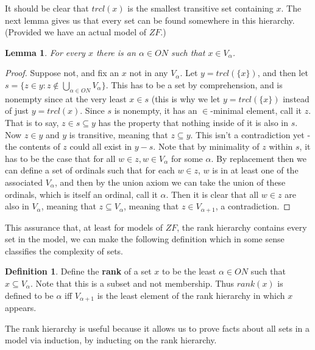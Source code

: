 \documentclass{article}
\theoremstyle{definition}
\newtheorem{definition}{Definition}[section]
\theoremstyle{plain}
\theoremstyle{theorem}
\newtheorem{lemma}{Lemma}[section]
\begin{document}
It should be clear that $trcl(x)$ is the smallest transitive set containing $x$. The next lemma gives us that every set can be found somewhere in this hierarchy. (Provided we have an actual model of $ZF$.)
\begin{lemma}
	For every $x$ there is an $\alpha \in ON$ such that $x \in V_{\alpha}$. 
\end{lemma}
\begin{proof}
	Suppose not, and fix an $x$ not in any $V_{\alpha}$. Let $y = trcl(\{x\})$, and then let $s = \{z \in y: z \notin \bigcup_{\alpha \in ON} V_{\alpha}\}$. This has to be a set by comprehension, and is nonempty since at the very least $x \in s$ (this is why we let $y = trcl(\{x\})$ instead of just $y = trcl(x)$. Since $s$ is nonempty, it has an $\in$-minimal element, call it $z$. That is to say, $z \in s \subseteq y$ has the property that nothing inside of it is also in $s$. Now $z \in y$ and $y$ is transitive, meaning that $z \subseteq y$. This isn't a contradiction yet - the contents of $z$ could all exist in $y-s$. Note that by minimality of $z$ within $s$, it has to be the case that for all $w \in z, w \in V_{\alpha}$ for some $\alpha$. By replacement then we can define a set of ordinals such that for each $w \in z$, $w$ is in at least one of the associated $V_{\alpha}$, and then by the union axiom we can take the union of these ordinals, which is itself an ordinal, call it $\alpha$. Then it is clear that all $w \in z$ are also in $V_{\alpha}$, meaning that $z \subseteq V_{\alpha}$, meaning that $z \in V_{\alpha+1}$, a contradiction.
\end{proof}
This assurance that, at least for models of $ZF$, the rank hierarchy contains every set in the model, we can make the following definition which in some sense classifies the complexity of sets.
\begin{definition}
	Define the \textbf{rank} of a set $x$ to be the least $\alpha \in ON$ such that $x \subseteq V_{\alpha}$. Note that this is a subset and not membership. Thus $rank(x)$ is defined to be $\alpha$ iff $V_{\alpha+1}$ is the least element of the rank hierarchy in which $x$ appears. 
\end{definition}
The rank hierarchy is useful because it allows us to prove facts about all sets in a model via induction, by inducting on the rank hierarchy. 
\end{document}
